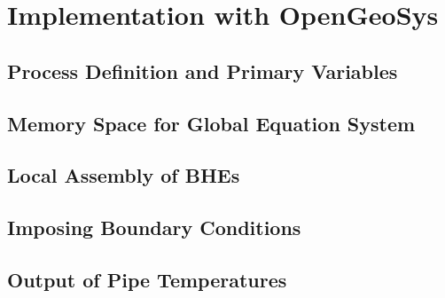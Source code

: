 \chapter{Implementation with OpenGeoSys}

\section{Process Definition and Primary Variables}

\section{Memory Space for Global Equation System}

\section{Local Assembly of BHEs}

\section{Imposing Boundary Conditions}

\section{Output of Pipe Temperatures}